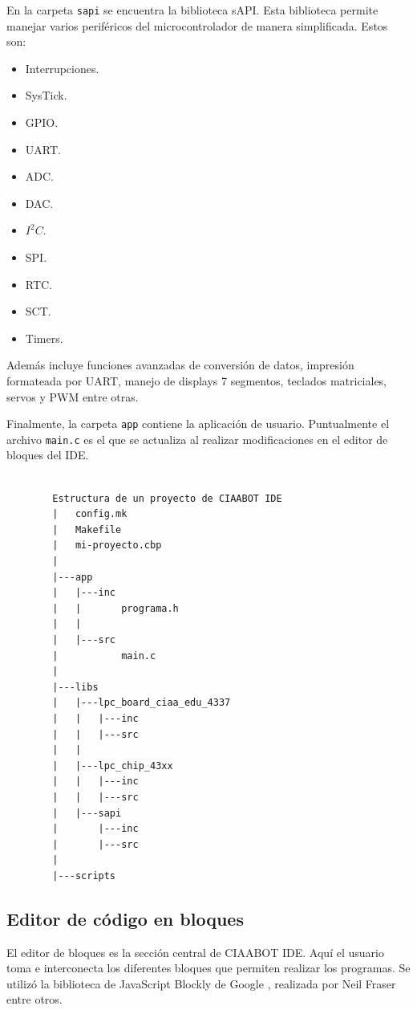 En la carpeta \texttt{sapi} se encuentra la biblioteca sAPI. Esta biblioteca permite manejar varios periféricos del microcontrolador de manera simplificada. Estos son:

\begin{itemize}
\item Interrupciones.
\item SysTick.
\item GPIO.
\item UART.
\item ADC.
\item DAC.
\item $I^2C$.
\item SPI.
\item RTC.
\item SCT.
\item Timers.
\end{itemize}

Además incluye funciones avanzadas de conversión de datos, impresión formateada por UART, manejo de displays 7 segmentos, teclados matriciales, servos y PWM entre otras.

Finalmente, la carpeta \texttt{app} contiene la aplicación de usuario. Puntualmente el archivo \texttt{main.c} es el que se actualiza al realizar modificaciones en el editor de bloques del IDE.

\begin{minipage}{\linewidth}
\begin{verbatim}

        Estructura de un proyecto de CIAABOT IDE
        |   config.mk
        |   Makefile
        |   mi-proyecto.cbp
        |
        |---app
        |   |---inc
        |   |       programa.h
        |   |
        |   |---src
        |           main.c
        |
        |---libs
        |   |---lpc_board_ciaa_edu_4337
        |   |   |---inc
        |   |   |---src
        |   |
        |   |---lpc_chip_43xx
        |   |   |---inc
        |   |   |---src
        |   |---sapi
        |       |---inc
        |       |---src
        |
        |---scripts
\end{verbatim}
\label{fig:estructura-archivos}
\end{minipage}



\subsection{Editor de código en bloques}
El editor de bloques es la sección central de CIAABOT IDE. Aquí el usuario toma e interconecta los diferentes bloques que permiten realizar los programas. Se utilizó la biblioteca de JavaScript Blockly de Google \citep{blockly}, realizada por Neil Fraser entre otros.

